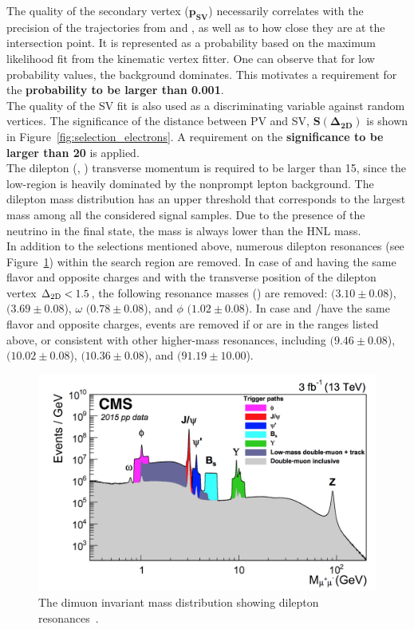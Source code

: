 The quality of the secondary vertex ($\boldsymbol{ p_{SV}}$)
necessarily correlates with the precision of the trajectories from
\ltwo and \lthree, as well as to how close they are at the intersection point. It is represented as a probability based on the maximum likelihood fit from the kinematic vertex fitter. One can observe that for low probability values, the background dominates. This motivates a requirement for the \textbf{probability to be larger than 0.001}. \\

The quality of the SV fit is also used as a discriminating variable against random vertices. The significance of the distance between PV and SV, $\boldsymbol{ S(\Delta_{2D})}$ is shown in Figure~\ref{fig:selection_electrons}. A requirement on the \textbf{significance to be larger than 20} is applied.\\

The dilepton (\ltwo, \lthree) transverse momentum  is required to be
larger than 15\GeV, since the low-\pt region is heavily dominated by
the nonprompt lepton background.
The dilepton mass \mtwol distribution has an upper threshold that
corresponds to the largest mass among all the considered signal
samples. Due to the presence of the neutrino in the final state, the
mass is always lower than the HNL mass.\\

In addition to the selections mentioned above, numerous dilepton
resonances (see Figure~\ref{fig:c6dimuon}) within the search
 region are removed.
In case of \ltwo and \lthree having the same flavor and opposite
charges and with the transverse position of the dilepton vertex
$\Delta_{\mathrm{2D}}<1.5$\cm, the following resonance masses (\mtwol) are
removed: 
\JPsi $(3.10 \pm 0.08$\GeV), \Pgy $(3.69 \pm 0.08$\GeV), $\omega$
$(0.78 \pm 0.08$\GeV), and $\phi$ $(1.02 \pm 0.08$\GeV).
In case \lone and \ltwo/\lthree have the same flavor and opposite
charges, events are removed if \mlonetwo or \mlonethree are in the
ranges listed above, or consistent with other higher-mass resonances,
including \PgUa $(9.46 \pm 0.08$\GeV), \PgUb $(10.02 \pm 0.08$\GeV),
\PgUc $(10.36 \pm 0.08$\GeV), and \PZ $(91.19 \pm 10.00$\GeV).
 \begin{figure}[h]
\centering
\includegraphics[clip,trim=1.2cm 0.1cm 0.8cm 0.3cm, width=.70\textwidth]{Figures/c2/dimuon}
\caption{The dimuon invariant mass distribution showing dilepton resonances~\cite{Sirunyan_2018_muon}.}
\label{fig:c6dimuon}
\end{figure}


